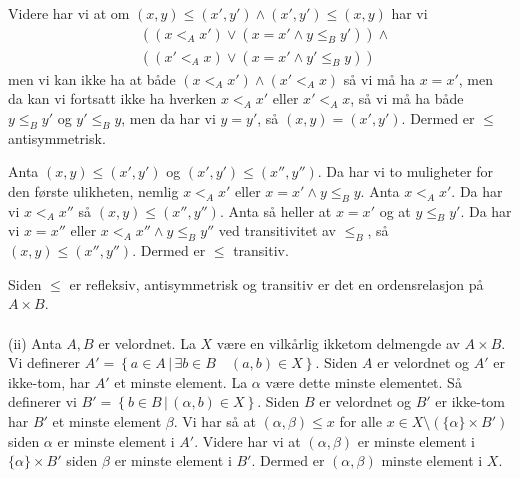 \documentclass{article}[norsk]
\begin{document}
Videre har vi at om $(x,y)\leq(x',y')\wedge(x',y')\leq(x,y)$ har vi 
\begin{equation*} \begin{aligned}
    &\left( (x <_A x')\vee(x=x'\wedge y\leq_B y')\right)\wedge\\
	&\left( (x' <_A x)\vee(x=x'\wedge y'\leq_B y)\right)
\end{aligned} \end{equation*}
men vi kan ikke ha at både $(x<_A x')\wedge(x' <_A x)$ så vi må ha $x=x'$, men da kan vi fortsatt ikke ha hverken $x<_A x'$ eller $x'<_A x$, så vi må ha både $y\leq_B y'$ og $y'\leq_B y$, men da har vi $y=y'$, så $(x,y)=(x',y')$. Dermed er $\leq$ antisymmetrisk.

Anta $(x,y)\leq (x',y')$ og $(x',y')\leq(x'',y'')$. Da har vi to muligheter for den første ulikheten, nemlig $x<_Ax'$ eller $x=x'\wedge y\leq_B y$. Anta $x<_A x'$. Da har vi $x<_A x''$ så $(x,y)\leq(x'',y'')$. Anta så heller at $x=x'$ og at $y\leq_B y'$. Da har vi $x=x''$ eller $x<_A x''\wedge y\leq_By''$ ved  transitivitet av $\leq_B$, så $(x,y)\leq(x'',y'')$. Dermed er $\leq$ transitiv.

Siden $\leq$ er refleksiv, antisymmetrisk og transitiv er det en ordensrelasjon på $A\times B$. 
\\\\
(ii) %
Anta $A,B$ er velordnet. La $X$ være en vilkårlig ikketom delmengde av $A\times B$. Vi definerer $A'=\left\{a\in A\,|\, \exists b\in B\quad (a,b)\in X\right\}$. Siden $A$ er velordnet og $A'$ er ikke-tom, har $A'$ et minste element. La $\alpha$ være dette minste elementet. Så definerer vi $B'=\left\{b\in B\,|\,(\alpha,b)\in X\right\}$. Siden $B$ er velordnet og $B'$ er ikke-tom har $B'$ et minste element $\beta$. Vi har så at $(\alpha,\beta)\leq x$ for alle $x\in X\setminus (\{\alpha\}\times B')$siden $\alpha$ er minste element i $A'$. Videre har vi at $(\alpha,\beta)$ er minste element i $\{\alpha\}\times B'$ siden $\beta$ er minste element i $B'$. Dermed er $(\alpha,\beta)$ minste element i $X$. 
\end{document}
